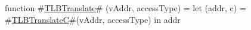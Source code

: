 function #\hyperref[sailMIPSzTLBTranslate]{TLBTranslate}# (vAddr, accessType) =
      let (addr, c) = #\hyperref[sailMIPSzTLBTranslateC]{TLBTranslateC}#(vAddr, accessType) in addr
